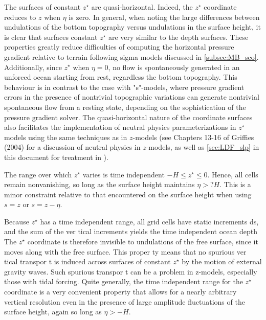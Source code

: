 \documentclass[../main/NEMO_manual]{subfiles}
\begin{document}
The surfaces of constant $z^\star$ are quasi-horizontal.
Indeed, the $z^\star$ coordinate reduces to $z$ when $\eta$ is zero.
In general, when noting the large differences between undulations of the bottom topography versus undulations in
the surface height, it is clear that surfaces constant $z^\star$ are very similar to the depth surfaces.
These properties greatly reduce difficulties of computing the horizontal pressure gradient relative to
terrain following sigma models discussed in \autoref{subsec:MB_sco}.
Additionally, since $z^\star$ when $\eta = 0$, no flow is spontaneously generated in
an unforced ocean starting from rest, regardless the bottom topography.
This behaviour is in contrast to the case with "s"-models, where pressure gradient errors in the presence of
nontrivial topographic variations can generate nontrivial spontaneous flow from a resting state,
depending on the sophistication of the pressure gradient solver.
The quasi-horizontal nature of the coordinate surfaces also facilitates the implementation of
neutral physics parameterizations in $z^\star$ models using the same techniques as in $z$-models
(see Chapters 13-16 of Griffies (2004) for a discussion of neutral physics in $z$-models,
as well as  \autoref{sec:LDF_slp} in this document for treatment in \NEMO).

The range over which $z^\star$ varies is time independent $-H \leq z^\star \leq 0$.
Hence, all cells remain nonvanishing, so long as the surface height maintains $\eta > ?H$.
This is a minor constraint relative to that encountered on the surface height when using $s = z$ or $s = z - \eta$.

Because $z^\star$ has a time independent range, all grid cells have static increments ds,
and the sum of the ver tical increments yields the time independent ocean depth %
The $z^\star$ coordinate is therefore invisible to undulations of the free surface,
since it moves along with the free surface.
This proper ty means that no spurious ver tical transpor t is induced across surfaces of
constant $z^\star$ by the motion of external gravity waves.
Such spurious transpor t can be a problem in z-models, especially those with tidal forcing.
Quite generally, the time independent range for the $z^\star$ coordinate is a very convenient property that
allows for a nearly arbitrary vertical resolution even in the presence of large amplitude fluctuations of
the surface height, again so long as $\eta > -H$.

\end{document}
